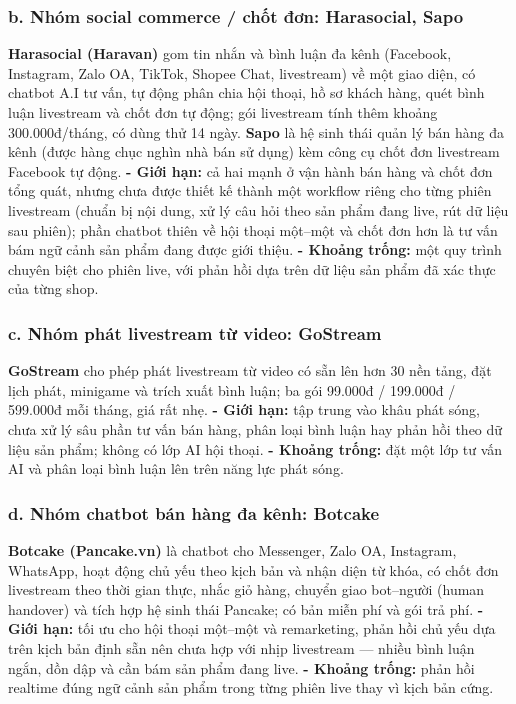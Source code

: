 \subsubsection*{b. Nhóm social commerce / chốt đơn: Harasocial, Sapo}
\textbf{Harasocial (Haravan)} gom tin nhắn và bình luận đa kênh (Facebook,
Instagram, Zalo OA, TikTok, Shopee Chat, livestream) về một giao diện, có chatbot
A.I tư vấn, tự động phân chia hội thoại, hồ sơ khách hàng, quét bình luận
livestream và chốt đơn tự động; gói livestream tính thêm khoảng 300.000đ/tháng,
có dùng thử 14 ngày. 
\newline
\textbf{Sapo} là hệ sinh thái quản lý bán hàng đa kênh (được
hàng chục nghìn nhà bán sử dụng) kèm công cụ chốt đơn livestream Facebook tự động.
\newline 
\textbf{- Giới hạn:} cả hai mạnh ở vận hành bán hàng và chốt đơn tổng quát, nhưng
chưa được thiết kế thành một workflow riêng cho từng phiên livestream (chuẩn bị
nội dung, xử lý câu hỏi theo sản phẩm đang live, rút dữ liệu sau phiên); phần
chatbot thiên về hội thoại một--một và chốt đơn hơn là tư vấn bám ngữ cảnh sản
phẩm đang được giới thiệu. 
\newline
\textbf{- Khoảng trống:} một quy trình chuyên biệt cho
phiên live, với phản hồi dựa trên dữ liệu sản phẩm đã xác thực của từng shop.

\subsubsection*{c. Nhóm phát livestream từ video: GoStream}
\textbf{GoStream} cho phép phát livestream từ video có sẵn lên hơn 30 nền tảng,
đặt lịch phát, minigame và trích xuất bình luận; ba gói 99.000đ / 199.000đ /
599.000đ mỗi tháng, giá rất nhẹ. 
\newline
\textbf{- Giới hạn:} tập trung vào khâu phát sóng,
chưa xử lý sâu phần tư vấn bán hàng, phân loại bình luận hay phản hồi theo dữ liệu
sản phẩm; không có lớp AI hội thoại. 
\newline
\textbf{- Khoảng trống:} đặt một lớp tư vấn AI
và phân loại bình luận lên trên năng lực phát sóng.

\subsubsection*{d. Nhóm chatbot bán hàng đa kênh: Botcake}
\textbf{Botcake (Pancake.vn)} là chatbot cho Messenger, Zalo OA, Instagram,
WhatsApp, hoạt động chủ yếu theo kịch bản và nhận diện từ khóa, có chốt đơn
livestream theo thời gian thực, nhắc giỏ hàng, chuyển giao bot--người
(human handover) và tích hợp hệ sinh thái Pancake; có bản miễn phí và gói trả phí.
\newline
\textbf{- Giới hạn:} tối ưu cho hội thoại một--một và remarketing, phản hồi chủ yếu
dựa trên kịch bản định sẵn nên chưa hợp với nhịp livestream --- nhiều bình luận
ngắn, dồn dập và cần bám sản phẩm đang live. 
\newline
\textbf{- Khoảng trống:} phản hồi
realtime đúng ngữ cảnh sản phẩm trong từng phiên live thay vì kịch bản cứng.


